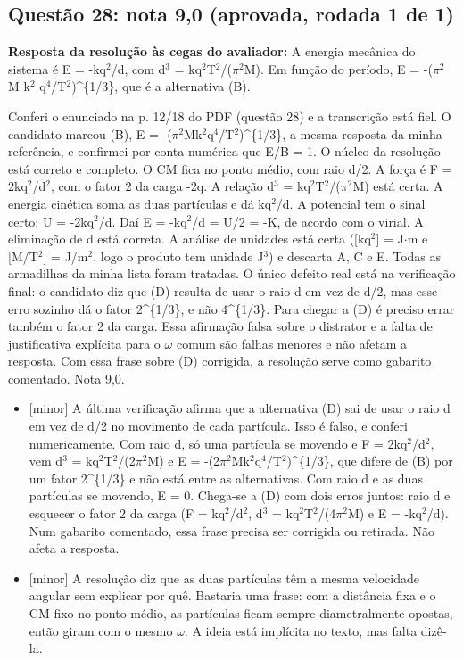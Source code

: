 \documentclass{article}%
\begin{document}
\subsection*{Questão 28: nota 9,0 (aprovada, rodada 1 de 1)}%
\textbf{Resposta da resolução às cegas do avaliador:} A energia mecânica do sistema é E = -kq$^2$/d, com d$^3$ = kq$^2$T$^2$/($\pi$$^2$M). Em função do período, E = -($\pi$$^2$ M k$^2$ q$^{4}$/T$^2$)\^{}\{1/3\}, que é a alternativa (B).\par %
Conferi o enunciado na p. 12/18 do PDF (questão 28) e a transcrição está fiel. O candidato marcou (B), E = -($\pi$$^2$Mk$^2$q$^{4}$/T$^2$)\^{}\{1/3\}, a mesma resposta da minha referência, e confirmei por conta numérica que E/B = 1. O núcleo da resolução está correto e completo. O CM fica no ponto médio, com raio d/2. A força é F = 2kq$^2$/d$^2$, com o fator 2 da carga -2q. A relação d$^3$ = kq$^2$T$^2$/($\pi$$^2$M) está certa. A energia cinética soma as duas partículas e dá kq$^2$/d. A potencial tem o sinal certo: U = -2kq$^2$/d. Daí E = -kq$^2$/d = U/2 = -K, de acordo com o virial. A eliminação de d está correta. A análise de unidades está certa ({[}kq$^2${]} = J$\cdot$m e {[}M/T$^2${]} = J/m$^2$, logo o produto tem unidade J$^3$) e descarta A, C e E. Todas as armadilhas da minha lista foram tratadas. O único defeito real está na verificação final: o candidato diz que (D) resulta de usar o raio d em vez de d/2, mas esse erro sozinho dá o fator 2\^{}\{1/3\}, e não 4\^{}\{1/3\}. Para chegar a (D) é preciso errar também o fator 2 da carga. Essa afirmação falsa sobre o distrator e a falta de justificativa explícita para o $\omega$ comum são falhas menores e não afetam a resposta. Com essa frase sobre (D) corrigida, a resolução serve como gabarito comentado. Nota 9,0.%
\begin{itemize}%
\item%
{[}minor{]} A última verificação afirma que a alternativa (D) sai de usar o raio d em vez de d/2 no movimento de cada partícula. Isso é falso, e conferi numericamente. Com raio d, só uma partícula se movendo e F = 2kq$^2$/d$^2$, vem d$^3$ = kq$^2$T$^2$/(2$\pi$$^2$M) e E = -(2$\pi$$^2$Mk$^2$q$^{4}$/T$^2$)\^{}\{1/3\}, que difere de (B) por um fator 2\^{}\{1/3\} e não está entre as alternativas. Com raio d e as duas partículas se movendo, E = 0. Chega{-}se a (D) com dois erros juntos: raio d e esquecer o fator 2 da carga (F = kq$^2$/d$^2$, d$^3$ = kq$^2$T$^2$/(4$\pi$$^2$M) e E = -kq$^2$/d). Num gabarito comentado, essa frase precisa ser corrigida ou retirada. Não afeta a resposta.%
\item%
{[}minor{]} A resolução diz que as duas partículas têm a mesma velocidade angular sem explicar por quê. Bastaria uma frase: com a distância fixa e o CM fixo no ponto médio, as partículas ficam sempre diametralmente opostas, então giram com o mesmo $\omega$. A ideia está implícita no texto, mas falta dizê{-}la.%
\end{itemize}%
\end{document}
